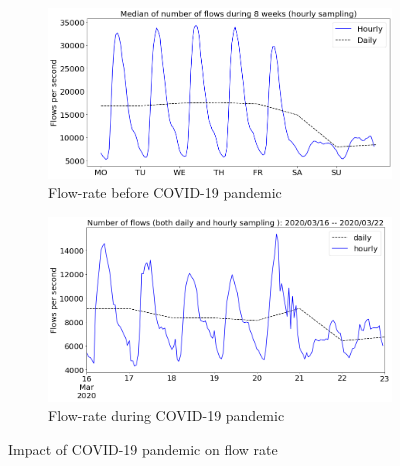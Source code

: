 \documentclass[10pt, journal, letterpaper]{IEEEtran}
\newcommand\figSzeMahdi{0.8}
\begin{document}
\begin{figure}
    \begin{subfigure}{\figSzeMahdi\columnwidth}
          \centering
          \includegraphics[width=\columnwidth]{img/BCO_flowrate.png}
          \caption{Flow-rate before COVID-19 pandemic}
          \label{fig:BCO_fps}
    \end{subfigure}
    \begin{subfigure}{\figSzeMahdi\columnwidth}
          \centering
          \includegraphics[width=\columnwidth]{img/CO2_flowrate.png}
          \caption{Flow-rate during COVID-19 pandemic}
          \label{fig:CO_fps}
    \end{subfigure}
    \caption{Impact of COVID-19 pandemic on flow rate}
    \label{fig:flowrate_BCO_CO}
\end{figure}
\end{document}
